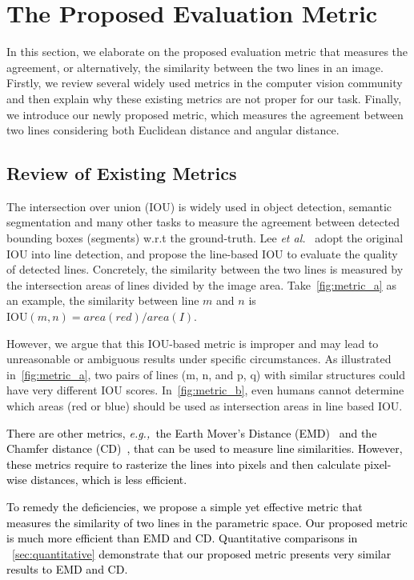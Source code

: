\documentclass[10pt,journal,cspaper,compsoc]{IEEEtran}
\newcommand{\rerevise}[1]{{\textcolor{black}{#1}}}
\def\etal{\emph{et al.~}}
\def\eg{\emph{e.g.,~}}
\begin{document}
\section{The Proposed Evaluation Metric} 
\label{sec:metric}

In this section, we elaborate on the 
proposed evaluation metric that measures the agreement, or alternatively, 
the similarity between the two lines in an image.
Firstly, we review several widely used metrics in the computer vision community 
and then explain why these existing metrics are not proper for our task.
Finally, we introduce our newly proposed metric, which measures the agreement between two lines considering
both Euclidean distance and angular distance.


\subsection{Review of Existing Metrics}
The intersection over union (IOU) is widely used in object detection, semantic segmentation
and many other tasks to measure the agreement between detected bounding boxes
(segments) w.r.t the ground-truth.
Lee \etal \cite{lee2017semantic} adopt the original IOU into line detection,
and propose the line-based IOU to evaluate the quality of detected lines.
Concretely, the similarity between the two lines is measured by the intersection areas
of lines divided by the image area.
Take~\cref{fig:metric_a} as an example, the similarity between line $m$ and $n$
is $\text{IOU}(m,n) = area({{red}})/area(I)$.

However, we argue that this IOU-based metric is improper  and may lead to unreasonable
or ambiguous results under specific circumstances.
As illustrated in~\cref{fig:metric_a}, 
two pairs of lines (m, n, and p, q) with similar structures could have
very different IOU scores.
In~\cref{fig:metric_b}, even humans cannot determine which areas
({red} or {blue}) should be used as
intersection areas in line based IOU.

\rerevise{There are other metrics,
\eg the Earth Mover's Distance (EMD)~\cite{rubner2000earth}
and the Chamfer distance (CD)~\cite{borgefors1986distance},
that can be used to measure line similarities.
However, these metrics require to rasterize the lines into pixels
and then calculate pixel-wise distances, which is less efficient.
}

\rerevise{
To remedy the deficiencies,
we propose a simple yet effective metric that measures the similarity 
of two lines in the parametric space.
Our proposed metric is much more efficient than EMD and CD.
Quantitative comparisons in ~\cref{sec:quantitative} demonstrate that 
our proposed metric presents very similar results to EMD and CD.}
\end{document}

